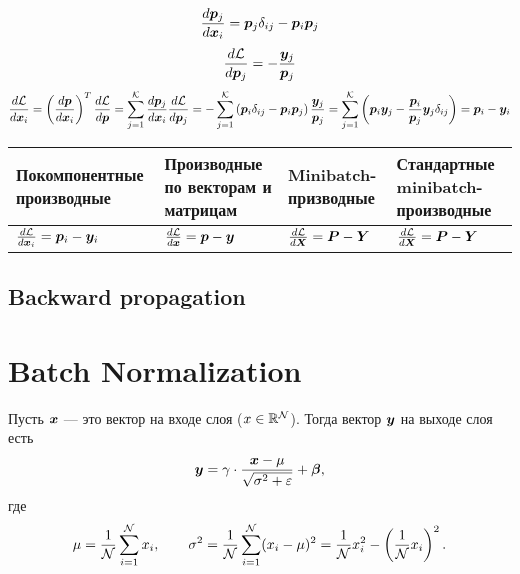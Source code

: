 \documentclass{report}
\numberwithin{theorem}{chapter}
\numberwithin{statement}{chapter}
\numberwithin{lemma}{chapter}
\theoremstyle{definition}
\numberwithin{task}{chapter}
\theoremstyle{remark}
\numberwithin{example}{chapter}
\theoremstyle{definition}
\numberwithin{definition}{chapter}
\theoremstyle{remark}
\theoremstyle{remark}
\numberwithin{lyrics}{section}
\begin{document}
\begin{gather*}
\frac{d\boldsymbol{p}_j}{d \boldsymbol{x}_i} = \boldsymbol{p}_j \delta_{ij} - \boldsymbol{p}_i \boldsymbol{p}_j
\end{gather*}
\begin{gather*}
\frac{d \mathcal{L}}{d \boldsymbol{p}_j} = -\frac{\boldsymbol{y}_j}{\boldsymbol{p}_j}
\end{gather*}
\begin{gather*}
\frac{d\mathcal{L}}{d \boldsymbol{x}_i} = \left(\frac{d \boldsymbol{p}}{d \boldsymbol{x}_i}\right)^T \frac{d \mathcal{L}}{d \boldsymbol{p}} = 
\sum\limits_{j=1}^{\mathcal{K}} \frac{d \boldsymbol{p}_j}{d \boldsymbol{x}_i} \frac{d \mathcal{L}}{d \boldsymbol{p}_j} = - \sum\limits_{j=1}^{\mathcal{K}}  \left(\boldsymbol{p}_i \delta_{ij} - \boldsymbol{p}_i \boldsymbol{p}_j \right) \frac{\boldsymbol{y}_j}{\boldsymbol{p}_j} = \sum\limits_{j=1}^{\mathcal{K}}  \left(\boldsymbol{p}_i \boldsymbol{y}_j - \frac{\boldsymbol{p}_i}{\boldsymbol{p}_j} \boldsymbol{y}_j \delta_{ij}\right) = \boldsymbol{p}_i - \boldsymbol{y}_i
\end{gather*}

\begin{tabularx}{\textwidth}{|p{4cm}|p{4cm}|p{4cm}|p{4cm}|}
\hline
Покомпонентные производные                        &Производные по векторам и матрицам          &Minibatch-призводные &Стандартные minibatch-производные \\ \hline
$\frac{d\mathcal{L}}{d \boldsymbol{x}_i} = \boldsymbol{p}_i - \boldsymbol{y}_i$ &$\frac{d\mathcal{L}}{d \boldsymbol{x}} = \boldsymbol{p} - \boldsymbol{y}$ &$\frac{d\mathcal{L}}{d \boldsymbol{X}} = \boldsymbol{P} - \boldsymbol{Y}$ &$\frac{d\mathcal{L}}{d \boldsymbol{X}} = \boldsymbol{P} - \boldsymbol{Y}$  \\ \hline
\end{tabularx}


\subsection{Backward propagation}

\section{Batch Normalization}

Пусть $\boldsymbol{x}$ --- это вектор на входе слоя ($x \in \mathbb{R}^{\mathcal{N}}$). Тогда вектор $\boldsymbol{y}$ на выходе слоя есть
$$
\boldsymbol{y} = \gamma \cdot \frac{\boldsymbol{x} - \mu}{\sqrt{\sigma^2 + \varepsilon}} + \boldsymbol{\beta},
$$
где $$\mu = \frac{1}{\mathcal{N}}\sum\limits_{i=1}^{\mathcal{N}} x_i, \qquad \sigma^2 = \frac{1}{\mathcal{N}}\sum\limits_{i = 1}^{\mathcal{N}} (x_i - \mu)^2 = \frac{1}{\mathcal{N}} x_i^2 - \left(\frac{1}{\mathcal{N}} x_i \right)^2.$$
\end{document}
